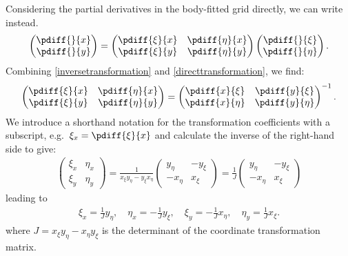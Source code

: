 %
Considering the partial derivatives in the body-fitted grid directly, we can write instead.
%
\begin{align}\label{directtransformation}
	\begin{pmatrix} \pdiff{}{x} \\ \pdiff{}{y} \end{pmatrix}
	=
	\begin{pmatrix}
		\pdiff{\xi}{x} &
		\pdiff{\eta}{x} \\
		\pdiff{\xi}{y} &
		\pdiff{\eta}{y}
	\end{pmatrix}
	\begin{pmatrix} \pdiff{}{\xi} \\ \pdiff{}{\eta} \end{pmatrix}.
\end{align}
%
Combining \autoref{inversetransformation} and \eqref{directtransformation}, we find:
%
\begin{align}
	\begin{pmatrix}
		\pdiff{\xi}{x} &
		\pdiff{\eta}{x} \\
		\pdiff{\xi}{y} &
		\pdiff{\eta}{y}
	\end{pmatrix}
	=
	\begin{pmatrix}
		\pdiff{x}{\xi} &
		\pdiff{y}{\xi} \\
		\pdiff{x}{\eta} &
		\pdiff{y}{\eta}
	\end{pmatrix}^{-1}.
\end{align}
%
We introduce a shorthand notation for the transformation coefficients with a subscript, e.g.\ $\xi_x = \pdiff{\xi}{x}$ and calculate the inverse of the right-hand side to give:
%
\begin{align}
	\begin{pmatrix}
		\xi_x &
		\eta_x \\
		\xi_y &
		\eta_y
	\end{pmatrix}
	=
	\frac{1}{x_{\xi}y_{\eta}-y_{\xi}x_{\eta}}
	\begin{pmatrix}
		y_{\eta} &
		-y_{\xi}\\
		-x_{\eta} &
		x_{\xi}
	\end{pmatrix}
	=
	\frac{1}{J}
	\begin{pmatrix}
		y_{\eta} &
		-y_{\xi}\\
		-x_{\eta} &
		x_{\xi}
	\end{pmatrix}
\end{align}
leading to
\begin{align}
	\xi_x=\frac{1}{J}y_{\eta}, \quad \eta_x = -\frac{1}{J}y_{\xi}, \quad
	\xi_y=-\frac{1}{J}x_{\eta}, \quad \eta_y = \frac{1}{J}x_{\xi}.
\end{align}
where $J = x_{\xi}y_{\eta}-x_{\eta}y_{\xi}$ is the determinant of the coordinate transformation matrix.

